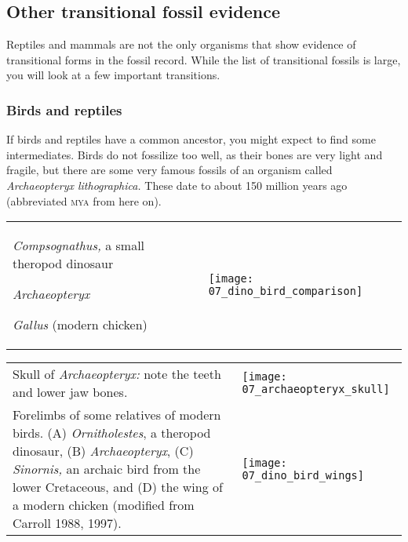 \documentclass[12pt, hidelinks]{exam}
\begin{document}
\subsection*{Other transitional fossil evidence}

Reptiles and mammals are not the only organisms that show evidence of transitional forms in the fossil record. While the list of transitional fossils is large, you will look at a few important transitions.

\subsubsection*{Birds and reptiles }

If birds and reptiles have a common ancestor, you might expect to find
some intermediates. Birds do not fossilize too well, as their bones are
very light and fragile, but there are some very famous fossils of an
organism called \textit{Archaeopteryx lithographica.} These date to about
150 million years ago (abbreviated \textsc{mya} from here on).

\begin{tabular}[t]{@{}L{0.3\textwidth}R{0.65\textwidth}@{}}


\textit{Compsognathus,} a small
theropod dinosaur

\vspace*{6\baselineskip}

\textit{Archaeopteryx}

\vspace*{7\baselineskip}

\textit{Gallus} (modern chicken)

\vfill 
 &

\texttt{[image: 07\_dino\_bird\_comparison]}\\

\end{tabular}


\newpage

\begin{tabular}{@{}L{0.45\textwidth}R{0.5\textwidth}@{}}


Skull of \textit{Archaeopteryx:} note the teeth and lower jaw bones. &

\texttt{[image: 07\_archaeopteryx\_skull]} \\



Forelimbs of some relatives of modern birds. 
(A) \textit{Ornitholestes}, a theropod dinosaur, 
(B) \textit{Archaeopteryx}, (C) \textit{Sinornis,} an archaic bird from 
the lower Cretaceous, and (D) the wing of a modern chicken (modified 
from Carroll 1988, 1997). &

\texttt{[image: 07\_dino\_bird\_wings]}\\

\end{tabular}
\end{document}
